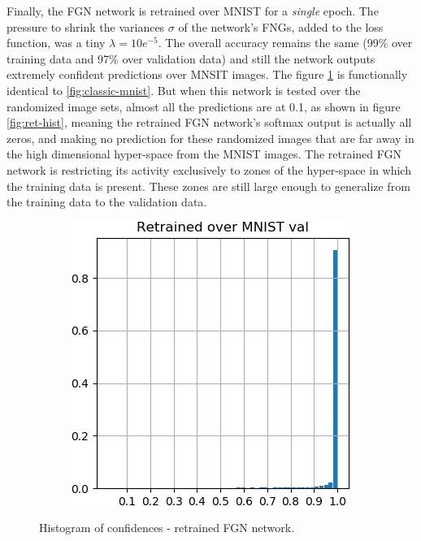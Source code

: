 \documentclass[12pt,oneside]{CUNY_PhD}
\begin{document}
Finally, the FGN network is retrained over MNIST for a \emph{single} epoch. The pressure to shrink the variances $\sigma$ of the network's FNGs, added to the loss function, was a tiny $\lambda=10e^{-5}$. The overall accuracy remains the same (99\% over training data and 97\% over validation data) and still the network outputs extremely confident predictions over MNSIT images. The figure \ref{fig:retrained-mnist} is functionally identical to \ref{fig:classic-mnist}. But when this network is tested over the randomized image sets, almost all the predictions are at 0.1, as shown in figure \ref{fig:ret-hist}, meaning the retrained FGN network's softmax output is actually all zeros, and making no prediction for these randomized images that are far away in the high dimensional hyper-space from the MNIST images. The retrained FGN network is restricting its activity exclusively to zones of the hyper-space in which the training data is present. These zones are still large enough to generalize from the training data to the validation data.
\begin{figure}[!h]
    \centering
    \begin{subfigure}[t]{0.49\textwidth}
        \includegraphics[width=\textwidth]{images/mnist-behavior/retrained-hist-val.png}
    \end{subfigure}
    \caption{Histogram of confidences - retrained FGN network.}
    \label{fig:retrained-mnist}
\end{figure}
\end{document}
